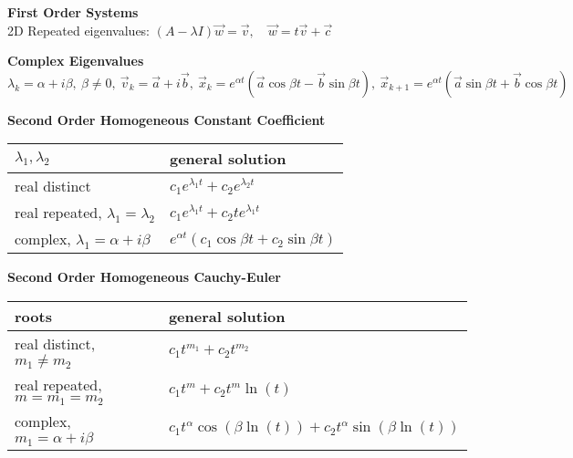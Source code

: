 \begin{center}
    \textbf{First Order Systems}\\
        2D Repeated eigenvalues: $\displaystyle (A-\lambda I) \vec w = \vec v, \quad \vec w = t\vec v + \vec c $
        
        \textbf{Complex Eigenvalues}\\
        $\displaystyle 
        \lambda_k = \alpha + i \beta, \ \beta \ne 0 , \ \vec v_k = \vec a + i \vec b, \ 
        \vec x_k = e^{\alpha t} (\vec a \cos \beta t - \vec b \sin \beta t), 
        \ 
        \vec x_{k+1} = e^{\alpha t} (\vec a \sin \beta t + \vec b \cos \beta t) $

    \vspace{0pt}
    \textbf{Second Order Homogeneous Constant Coefficient}
    \begin{tabular}{ p{4.2cm} p{4.6cm} }
        
        $\lambda_1, \lambda_2$ &  general solution 
        \\[2pt] \hline 
        real distinct &  $c_1 e^{\lambda_1 t} + c_2 e^{\lambda_2 t}$\\       
        real repeated, $\lambda_1 = \lambda_2$ & $c_1 e^{\lambda_1 t} + c_2 t e^{\lambda_1 t}$\\
        complex, $\lambda_1 = \alpha + i \beta$ & $e^{\alpha t} \left( c_1 \cos \beta t + c_2 \sin \beta t \right)$\\[2pt] \hline
    \end{tabular}    
    
    \vspace{4pt}
    \textbf{Second Order Homogeneous Cauchy-Euler}
    \begin{tabular}{ p{6.2cm} p{6cm} }
        roots &  general solution 
        \\[2pt] \hline 
        real distinct, $m_1 \ne m_2$ &  $c_1 t^{m_1} + c_2 t^{m_2}$\\       
        real repeated, $m = m_1 = m_2$ & $c_1 t^{m} + c_2 t^m \ln(t)$\\
        complex, $m_1 = \alpha + i \beta$ & $c_1t^{\alpha}\cos(\beta \ln(t)) + c_2t^{\alpha}\sin(\beta \ln (t))$\\[2pt] \hline
    \end{tabular}
    
    \vspace{4pt}
    

\end{center}
